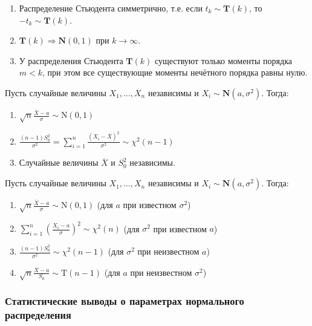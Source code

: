 \begin{namedthm}\leavevmode
\begin{enumerate}
    \item Распределение Стьюдента симметрично, т.е. если $t_k \sim \mathbf{T}(k)$, то $-t_k \sim \mathbf{T}(k)$.
    \item $\mathbf{T}(k) \Rightarrow \mathbf{N}(0,1)$ при $k \to \infty$.
    \item У распределения Стьюдента $\mathbf{T}(k)$ существуют только моменты порядка $m < k$, при этом все существующие моменты нечётного порядка равны нулю.
\end{enumerate}
\end{namedthm}

\begin{namedthm}
Пусть случайные величины $X_1, \ldots, X_n$ независимы и ${X_i \sim \mathbf{N}(a,\sigma^{2})}$. Тогда:
\begin{enumerate}
    \item $\sqrt{n} \frac{\overline{X}-a}{\sigma} \sim \mathrm{N}(0,1)$
    \item $\frac{(n-1) S_{0}^{2}}{\sigma^{2}}=\sum\limits_{i=1}^{n} \frac{\left(X_{i}-\overline{X}\right)^{2}}{\sigma^{2}} \sim \chi^{2}(n-1)$
    \item Случайные величины $\overline{X}$ и $S_{0}^{2}$ независимы.
\end{enumerate}
\end{namedthm}
\begin{crlr}
    Пусть случайные величины $X_1, \ldots, X_n$ независимы и ${X_i \sim \mathbf{N}(a,\sigma^{2})}$. Тогда:
    \begin{enumerate}
        \item $\sqrt{n} \frac{\overline{X}-a}{\sigma} \sim \mathrm{N}(0,1)$ (для $a$ при известном $\sigma^{2}$)
        \item $\sum\limits_{i=1}^{n}\left(\frac{X_{i}-a}{\sigma}\right)^{2} \sim \chi^{2}(n)$ (для $\sigma^{2}$ при известном $a$)
        \item $\frac{(n-1) S_{0}^{2}}{\sigma^{2}} \sim \chi^{2}(n-1)$ (для $\sigma^{2}$ при неизвестном $a$)
        \item $\sqrt{n} \frac{\overline{X}-a}{S_{0}} \sim \mathrm{T}(n-1)$ (для $a$ при неизвестном $\sigma^{2}$)
    \end{enumerate}
\end{crlr}

\subsubsection{Статистические выводы о параметрах нормального распределения}

